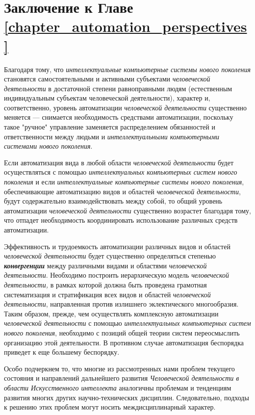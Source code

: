 \section*{Заключение к Главе \ref{chapter_automation_perspectives}}

Благодаря тому, что \textit{интеллектуальные компьютерные системы нового поколения} становятся самостоятельными и активными субъектами \textit{человеческой деятельности} в достаточной степени равноправными людям (естественным индивидуальным субъектам человеческой деятельности), характер и, соответственно, уровень автоматизации \textit{человеческой деятельности} существенно меняется --- снимается необходимость  средствами автоматизации, поскольку такое "ручное"{} управление заменяется распределением обязанностей и ответственности между людьми и \textit{интеллектуальными компьютерными системами нового поколения}.

Если автоматизация  вида в любой области \textit{человеческой деятельности} будет осуществляться с помощью \textit{интеллектуальных компьютерных систем нового поколения} и если \textit{интеллектуальные компьютерные системы нового поколения}, обеспечивающие автоматизацию  видов и областей \textit{человеческой деятельности}, будут содержательно взаимодействовать между собой, то общий уровень автоматизации \textit{человеческой деятельности} существенно возрастет благодаря тому, что отпадет необходимость  координировать использование различных средств автоматизации.

Эффективность и трудоемкость автоматизации различных видов и областей \textit{человеческой деятельности} будет существенно определяться степенью \textbf{\textit{конвергенции}} между различными видами и областями \textit{человеческой деятельности}. Необходимо построить иерархическую модель \textit{человеческой деятельности,} в рамках которой должна быть проведена грамотная систематизация и стратификация всех видов и областей \textit{человеческой деятельности}, направленная против излишнего эклектического многообразия. Таким образом, прежде, чем осуществлять комплексную автоматизации \textit{человеческой деятельности} с помощью \textit{интеллектуальных компьютерных систем} \textit{нового поколения}, необходимо с позиций общей теории систем переосмыслить организацию этой деятельности. В противном случае автоматизация беспорядка приведет к еще большему беспорядку.

Особо подчеркнем то, что многие из рассмотренных нами проблем текущего состояния и направлений дальнейшего развития \textit{Человеческой деятельности в области Искусственного интеллекта} аналогичны проблемам и тенденциям развития многих других научно-технических дисциплин. Следовательно, подходы к решению этих проблем могут носить междисциплинарный характер.

